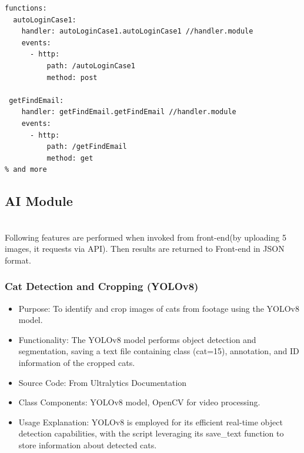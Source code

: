 \documentclass[conference]{IEEEtran}
\begin{document}
\begin{itemize}
\begin{lstlisting}[style=htmlcssjs]
functions:
  autoLoginCase1:
    handler: autoLoginCase1.autoLoginCase1 //handler.module
    events:
      - http:
          path: /autoLoginCase1
          method: post

 getFindEmail:
    handler: getFindEmail.getFindEmail //handler.module
    events:
      - http:
          path: /getFindEmail
          method: get
% and more
\end{lstlisting}
    \end{itemize}

\subsection{AI Module} \\
Following features are performed when invoked from front-end(by uploading 5 images, it requests via API). Then results are returned to Front-end in JSON format.\\
\subsubsection{Cat Detection and Cropping (YOLOv8)}
\begin{itemize}
    \item Purpose: To identify and crop images of cats from footage using the YOLOv8 model.
    \item Functionality: The YOLOv8 model performs object detection and segmentation, saving a text file containing class (cat=15), annotation, and ID information of the cropped cats.
    \item Source Code: From Ultralytics Documentation
    \item Class Components: YOLOv8 model, OpenCV for video processing.
    \item Usage Explanation: YOLOv8 is employed for its efficient real-time object detection capabilities, with the script leveraging its save\_text function to store information about detected cats.
    \vspace{0.5cm}
\end{itemize}
\end{document}
